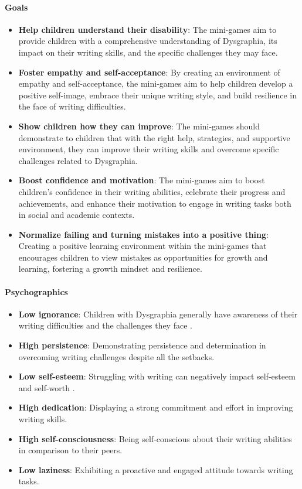 \paragraph{Goals}
\begin{itemize}
    \item \textbf{Help children understand their disability}: The mini-games aim to provide children with a comprehensive understanding of Dysgraphia, its impact on their writing skills, and the specific challenges they may face.
    \item \textbf{Foster empathy and self-acceptance}: By creating an environment of empathy and self-acceptance, the mini-games aim to help children develop a positive self-image, embrace their unique writing style, and build resilience in the face of writing difficulties.
    \item \textbf{Show children how they can improve}: The mini-games should demonstrate to children that with the right help, strategies, and supportive environment, they can improve their writing skills and overcome specific challenges related to Dysgraphia.
    \item \textbf{Boost confidence and motivation}: The mini-games aim to boost children's confidence in their writing abilities, celebrate their progress and achievements, and enhance their motivation to engage in writing tasks both in social and academic contexts.
    \item \textbf{Normalize failing and turning mistakes into a positive thing}: Creating a positive learning environment within the mini-games that encourages children to view mistakes as opportunities for growth and learning, fostering a growth mindset and resilience.
\end{itemize}

\paragraph{Psychographics}
\begin{itemize}
    \item \textbf{Low ignorance}: Children with Dysgraphia generally have awareness of their writing difficulties and the challenges they face \cite{cleveland_dysgraphia}.
    \item \textbf{High persistence}: Demonstrating persistence and determination in overcoming writing challenges despite all the setbacks.
    \item \textbf{Low self-esteem}: Struggling with writing can negatively impact self-esteem and self-worth \cite{cleveland_dysgraphia}.
    \item \textbf{High dedication}: Displaying a strong commitment and effort in improving writing skills.
    \item \textbf{High self-consciousness}: Being self-conscious about their writing abilities in comparison to their peers.
    \item \textbf{Low laziness}: Exhibiting a proactive and engaged attitude towards writing tasks.
\end{itemize}


